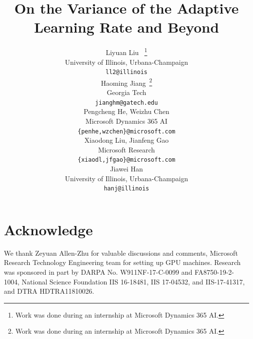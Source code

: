 \documentclass{article} %
\title{On the Variance of the Adaptive Learning Rate and Beyond}
\author{Liyuan Liu ~\thanks{Work was done during an internship at Microsoft Dynamics 365 AI.}\\
\footnotesize{University of Illinois, Urbana-Champaign} \\
\scriptsize{\texttt{ll2@illinois}}\\
\And
Haoming Jiang~\thanks{Work was done during an internship at Microsoft Dynamics 365 AI.}\\
\footnotesize{Georgia Tech}\\
\scriptsize{\texttt{jianghm@gatech.edu}}\\
\And
Pengcheng He, Weizhu Chen\\
\footnotesize{Microsoft Dynamics 365 AI}\\
\scriptsize{\texttt{\{penhe,wzchen\}@microsoft.com}}\\
\And
Xiaodong Liu, Jianfeng Gao\\
\footnotesize{Microsoft Research}\\
\scriptsize{\texttt{\{xiaodl,jfgao\}@microsoft.com}}\\
\And
Jiawei Han\\
\footnotesize{University of Illinois, Urbana-Champaign}\\
\scriptsize{\texttt{hanj@illinois}}
}
\begin{document}
\maketitle




% 

% 

% 
% 
% 

% 


\vspace{-0.2cm}
\section*{Acknowledge}
\vspace{-0.3cm}
We thank Zeyuan Allen-Zhu for valuable discussions and comments, Microsoft Research Technology Engineering team for setting up GPU machines.
Research was sponsored in part by DARPA No. W911NF-17-C-0099 and FA8750-19-2-1004, National Science Foundation IIS 16-18481, IIS 17-04532, and IIS-17-41317, and DTRA HDTRA11810026. 
\end{document}
